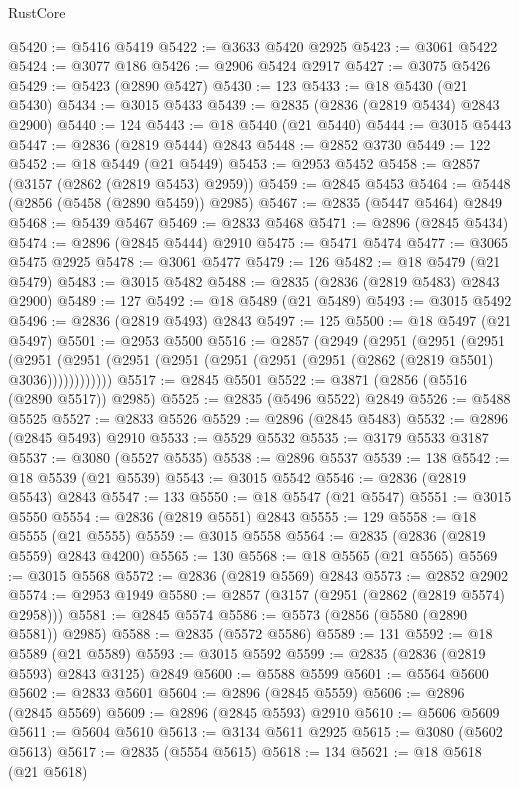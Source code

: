 \begin{lexlean}{RustCore}
\begin{coremodule}
@5420 := @5416 @5419
@5422 := @3633 @5420 @2925
@5423 := @3061 @5422
@5424 := @3077 @186
@5426 := @2906 @5424 @2917
@5427 := @3075 @5426
@5429 := @5423 (@2890 @5427)
@5430 := 123
@5433 := @18 @5430 (@21 @5430)
@5434 := @3015 @5433
@5439 := @2835 (@2836 (@2819 @5434) @2843 @2900)
@5440 := 124
@5443 := @18 @5440 (@21 @5440)
@5444 := @3015 @5443
@5447 := @2836 (@2819 @5444) @2843
@5448 := @2852 @3730
@5449 := 122
@5452 := @18 @5449 (@21 @5449)
@5453 := @2953 @5452
@5458 := @2857 (@3157 (@2862 (@2819 @5453) @2959))
@5459 := @2845 @5453
@5464 := @5448 (@2856 (@5458 (@2890 @5459)) @2985)
@5467 := @2835 (@5447 @5464) @2849
@5468 := @5439 @5467
@5469 := @2833 @5468
@5471 := @2896 (@2845 @5434)
@5474 := @2896 (@2845 @5444) @2910
@5475 := @5471 @5474
@5477 := @3065 @5475 @2925
@5478 := @3061 @5477
@5479 := 126
@5482 := @18 @5479 (@21 @5479)
@5483 := @3015 @5482
@5488 := @2835 (@2836 (@2819 @5483) @2843 @2900)
@5489 := 127
@5492 := @18 @5489 (@21 @5489)
@5493 := @3015 @5492
@5496 := @2836 (@2819 @5493) @2843
@5497 := 125
@5500 := @18 @5497 (@21 @5497)
@5501 := @2953 @5500
@5516 := @2857
    (@2949
      (@2951
        (@2951
          (@2951
            (@2951 (@2951 (@2951 (@2951 (@2951 (@2951 (@2951 (@2862 (@2819 @5501) @3036))))))))))))
@5517 := @2845 @5501
@5522 := @3871 (@2856 (@5516 (@2890 @5517)) @2985)
@5525 := @2835 (@5496 @5522) @2849
@5526 := @5488 @5525
@5527 := @2833 @5526
@5529 := @2896 (@2845 @5483)
@5532 := @2896 (@2845 @5493) @2910
@5533 := @5529 @5532
@5535 := @3179 @5533 @3187
@5537 := @3080 (@5527 @5535)
@5538 := @2896 @5537
@5539 := 138
@5542 := @18 @5539 (@21 @5539)
@5543 := @3015 @5542
@5546 := @2836 (@2819 @5543) @2843
@5547 := 133
@5550 := @18 @5547 (@21 @5547)
@5551 := @3015 @5550
@5554 := @2836 (@2819 @5551) @2843
@5555 := 129
@5558 := @18 @5555 (@21 @5555)
@5559 := @3015 @5558
@5564 := @2835 (@2836 (@2819 @5559) @2843 @4200)
@5565 := 130
@5568 := @18 @5565 (@21 @5565)
@5569 := @3015 @5568
@5572 := @2836 (@2819 @5569) @2843
@5573 := @2852 @2902
@5574 := @2953 @1949
@5580 := @2857 (@3157 (@2951 (@2862 (@2819 @5574) @2958)))
@5581 := @2845 @5574
@5586 := @5573 (@2856 (@5580 (@2890 @5581)) @2985)
@5588 := @2835 (@5572 @5586)
@5589 := 131
@5592 := @18 @5589 (@21 @5589)
@5593 := @3015 @5592
@5599 := @2835 (@2836 (@2819 @5593) @2843 @3125) @2849
@5600 := @5588 @5599
@5601 := @5564 @5600
@5602 := @2833 @5601
@5604 := @2896 (@2845 @5559)
@5606 := @2896 (@2845 @5569)
@5609 := @2896 (@2845 @5593) @2910
@5610 := @5606 @5609
@5611 := @5604 @5610
@5613 := @3134 @5611 @2925
@5615 := @3080 (@5602 @5613)
@5617 := @2835 (@5554 @5615)
@5618 := 134
@5621 := @18 @5618 (@21 @5618)

\end{coremodule}
\end{lexlean}
